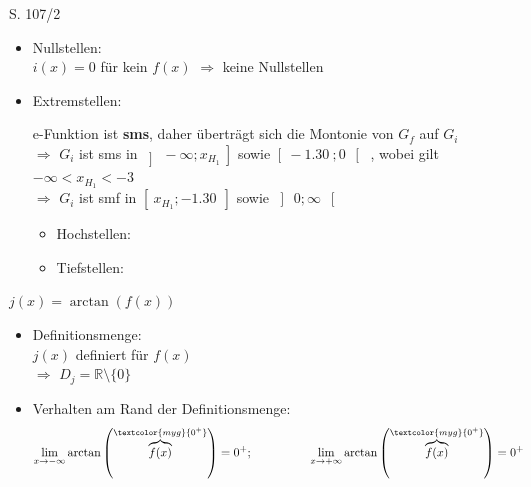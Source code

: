 \begin{Exercise}{S. 107/2}{}
\begin{enumerate}[label=\arabic*.,leftmargin=*]
{\begin{itemize}[leftmargin=*]
{                }
            \item Nullstellen: \\[1.0ex]{
                $i(x) = 0$ für kein $f(x)$ \qquad $\Rightarrow$ keine Nullstellen\\[-2.0ex]
                }
            \item Extremstellen: \\[1.0ex]{
                e-Funktion ist \textbf{sms}, daher überträgt sich die Montonie von $G_{f}$ auf $G_{i}$\\[1.0ex]
                $\Rightarrow$ \quad $G_{i}$ ist sms in $\left] \ -\infty; x_{H_{1}} \ \right]$ sowie $\left[ \ -\SI{1.30}{}; 0 \ \right[$ \quad, wobei gilt $-\infty < x_{H_{1}} < -3$ \\[1.0ex]
                $\Rightarrow$ \quad $G_{i}$ ist smf in $\left[ \ x_{H_{1}} ; -\SI{1.30}{} \ \right]$ sowie $\left] \ 0; \infty \ \right[$ \\[-2.0ex]
                \begin{itemize}
                    \item Hochstellen: 
                    \item Tiefstellen: \\
                \end{itemize}
                }
        \end{itemize}
        $j(x) =  \arctan\left(f(x)\right)$ \\[-3.0ex] 
        \begin{itemize}[leftmargin=*]
            \item Definitionsmenge: \\[1.0ex]{
                $j(x)$ definiert für $f(x)$\\[1.0ex]
                $\Rightarrow$ \quad $D_{j} = \mathbb{R} \setminus \{0\}$\\[-2.0ex]
                }
            \item Verhalten am Rand der Definitionsmenge: \\[-2.0ex]{
                \begin{align*}
                    \lim\limits_{x \to -\infty} \arctan\left(\overbrace{f(x)}^{\textcolor{myg}{0^{+}}}\right) &= 0^{+}; \qquad \qquad &\lim\limits_{x \to +\infty} \arctan\left(\overbrace{f(x)}^{\textcolor{myg}{0^{+}}}\right) &= 0^{+} && \\[1.5ex]

\end{align*}}
\end{itemize}}
\end{enumerate}
\end{Exercise}
